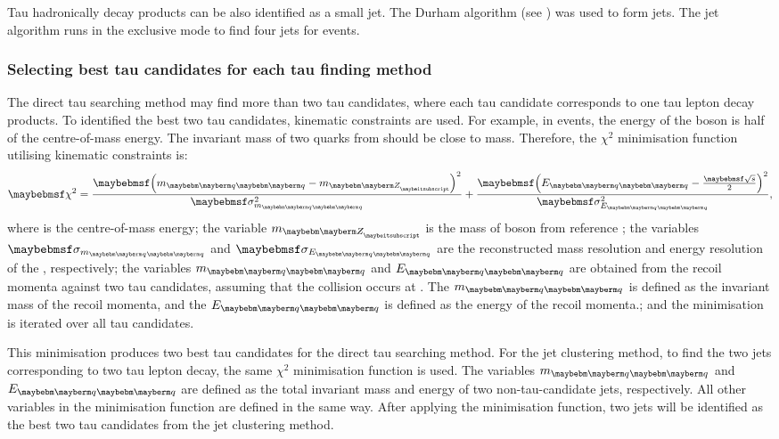 Tau hadronically decay products can be also identified as a small jet. The Durham algorithm  (see ) was used to form  jets. The jet algorithm runs in the exclusive mode to find four jets for \eeZZQQ events.


\subsubsection{Selecting best tau candidates for each tau finding method}

The direct tau searching method may find more than two tau  candidates, where each tau candidate corresponds to one tau lepton decay products. To identified the best two tau candidates, kinematic constraints are used.  For example, in  \HepProcess{\Pep \Pem \to \PZ \PZ} events, the energy of the \PZ boson is half of the centre-of-mass energy. The invariant mass of two quarks from \PZ should be close to \PZ mass. Therefore, the $\chi^2$ minimisation function utilising kinematic constraints is:
\begin{equation}
\chi^2 = \frac{\parenths{m_{\Pquark\Pquark} - m_{\PZ}}^2}{\sigma_{m_{\Pquark\Pquark}}^2} + \frac{\parenths{E_{\Pquark\Pquark} - \frac{\sqrtS}{2}}^2}{\sigma_{E_{\Pquark\Pquark}}^2},
\label{eq:tauMinimiser}
\end{equation}
where \sqrtS is the centre-of-mass energy; the variable $m_{\PZ}$ is the mass of \PZ boson from reference \cite{Agashe:2014kda}; the variables $\sigma_{m_{\Pquark\Pquark}}$ and $\sigma_{E_{\Pquark\Pquark}}$ are the reconstructed mass resolution  and energy resolution of the \ZToqq, respectively;  the variables $m_{\Pquark\Pquark}$ and  $E_{\Pquark\Pquark}$ are obtained from the recoil momenta against two tau candidates, assuming that the collision occurs at \sqrtS. The  $m_{\Pquark\Pquark}$ is defined as the invariant mass of the recoil momenta, and  the $E_{\Pquark\Pquark}$ is defined as the energy of the recoil momenta.; and the minimisation is iterated over all tau candidates.

This minimisation produces two best tau candidates for the direct tau searching method. For the jet clustering method, to find the two jets corresponding to two tau lepton decay, the same $\chi^2$ minimisation function is used.  The variables $m_{\Pquark\Pquark}$ and  $E_{\Pquark\Pquark}$ are defined as the total invariant mass and energy of two non-tau-candidate jets, respectively. All other variables in the minimisation function are defined in the same way. After applying the minimisation function, two jets will be identified as the best two tau candidates from the jet clustering method.


